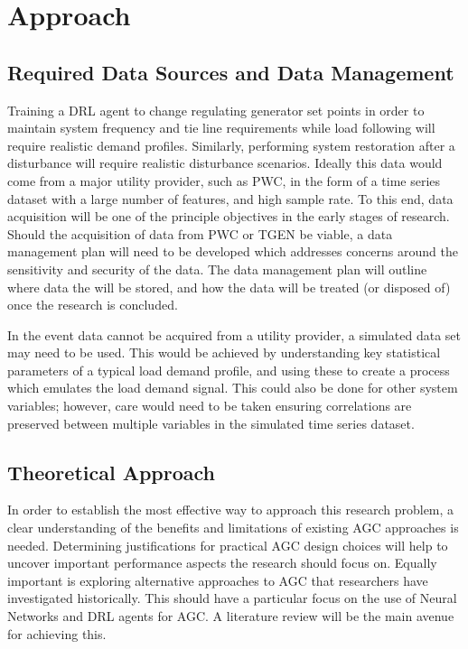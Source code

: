 \chapter{Approach}

\section{Required Data Sources and Data Management}\label{datamanagement}
Training a DRL agent to change regulating generator set points in order to maintain system frequency and tie line requirements while load following will require realistic demand profiles. Similarly, performing system restoration after a disturbance will require realistic disturbance scenarios. Ideally this data would come from a major utility provider, such as PWC, in the form of a time series dataset with a large number of features, and high sample rate. To this end, data acquisition will be one of the principle objectives in the early stages of research. Should the acquisition of data from PWC or TGEN be viable, a data management plan will need to be developed which addresses concerns around the sensitivity and security of the data. The data management plan will outline where data the will be stored, and how the data will be treated (or disposed of) once the research is concluded.

In the event data cannot be acquired from a utility provider, a simulated data set may need to be used. This would be achieved by understanding key statistical parameters of a typical load demand profile, and using these to create a process which emulates the load demand signal. This could also be done for other system variables; however, care would need to be taken ensuring correlations are preserved between multiple variables in the simulated time series dataset.

\section{Theoretical Approach}
In order to establish the most effective way to approach this research problem, a clear understanding of the benefits and limitations of existing AGC approaches is needed. Determining justifications for practical AGC design choices will help to uncover important performance aspects the research should focus on. Equally important is exploring alternative approaches to AGC that researchers have investigated historically. This should have a particular focus on the use of Neural Networks and DRL agents for AGC. A literature review will be the main avenue for achieving this.


